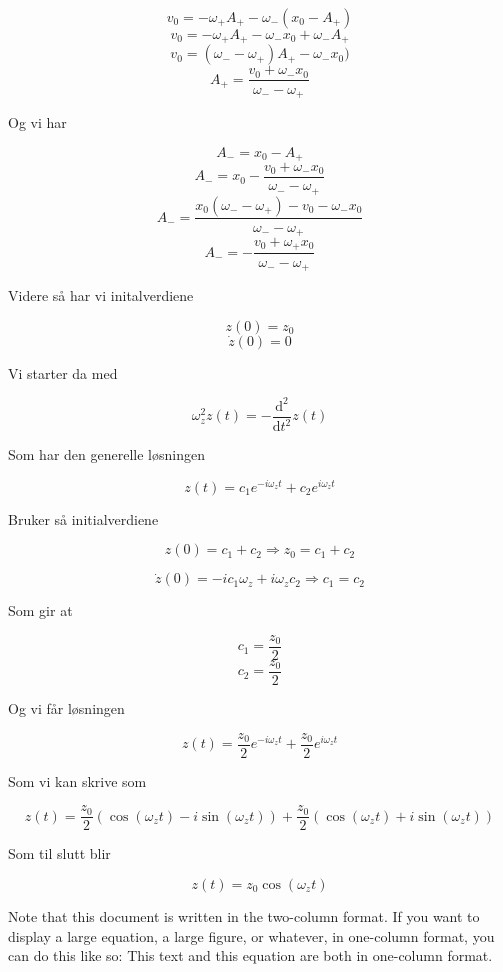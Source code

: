 \documentclass[reprint,english,notitlepage, nofootinbib]{revtex4-1}  %
\begin{document}
$$v_0 = -\omega_+A_+-\omega_-(x_0-A_+)$$
$$v_0 = -\omega_+A_+-\omega_-x_0+\omega_-A_+$$
$$v_0 = (\omega_--\omega_+)A_+ - \omega_-x_0)$$
$$A_+ = \frac{v_0+\omega_-x_0}{\omega_--\omega_+}$$

Og vi har

$$A_- = x_0 - A_+$$
$$A_- = x_0 - \frac{v_0+\omega_-x_0}{\omega_--\omega_+}$$
$$A_- = \frac{x_0(\omega_--\omega_+)-v_0-\omega_-x_0}{\omega_--\omega_+}$$
$$A_- = -\frac{v_0+\omega_+x_0}{\omega_--\omega_+}$$

Videre så har vi initalverdiene

$$z(0) = z_0$$
$$\dot{z}(0) = 0$$

Vi starter da med

$$\omega_z^2z(t) = -\frac{\mathrm{d}^2}{\mathrm{d}t^2} z(t)$$

Som har den generelle løsningen

$$z(t) = c_1e^{-i\omega_zt} + c_2e^{i\omega_zt}$$

Bruker så initialverdiene

$$z(0) = c_1 + c_2 \Rightarrow z_0 = c_1 + c_2$$

$$\dot{z}(0) = -ic_1\omega_z + i\omega_zc_2 \Rightarrow c_1 = c_2$$

Som gir at

$$c_1 = \frac{z_0}{2}$$
$$c_2 = \frac{z_0}{2}$$

Og vi får løsningen

$$z(t) = \frac{z_0}{2}e^{-i\omega_zt} + \frac{z_0}{2}e^{i\omega_zt}$$

Som vi kan skrive som

$$z(t) = \frac{z_0}{2}(\cos{(\omega_zt) - i\sin{(\omega_zt)}}) +  \frac{z_0}{2}(\cos{(\omega_zt) + i\sin{(\omega_zt)}})$$

Som til slutt blir

$$z(t) = z_0 \cos{(\omega_zt)}$$



\clearpage
Note that this document is written in the two-column format. If you want to display a large equation, a large figure, or whatever, in one-column format, you can do this like so:
\onecolumngrid
\vspace{1cm} %
This text and this equation are both in one-column format.
\end{document}
